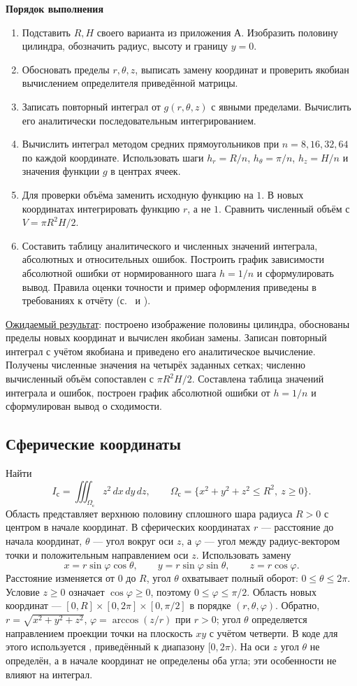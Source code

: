 \documentclass[12pt,a4paper]{article}
\newcommand{\taskhead}[1]{\par\textbf{#1}\par}
\begin{document}
\taskhead{Порядок выполнения}
\begin{enumerate}
\item Подставить $R,H$ своего варианта из приложения А.
Изобразить половину цилиндра, обозначить радиус, высоту и границу $y=0$.
\item Обосновать пределы $r,\theta,z$, выписать замену координат и проверить
якобиан вычислением определителя приведённой матрицы.
\item Записать повторный интеграл от $g(r,\theta,z)$ с явными пределами.
Вычислить его аналитически последовательным интегрированием.
\item Вычислить интеграл методом средних прямоугольников при $n=8,16,32,64$
по каждой координате. Использовать шаги $h_r=R/n$, $h_\theta=\pi/n$,
$h_z=H/n$ и значения функции $g$ в центрах ячеек.
\item Для проверки объёма заменить исходную функцию на $1$.
В новых координатах интегрировать функцию $r$, а не $1$.
Сравнить численный объём с $V=\pi R^2H/2$.
\item Составить таблицу аналитического и численных значений интеграла,
абсолютных и относительных ошибок. Построить график зависимости абсолютной
ошибки от нормированного шага $h=1/n$ и сформулировать вывод.
Правила оценки точности и пример оформления приведены в требованиях
к отчёту (с.~\pageref{sec:accuracy} и \pageref{sec:error-example}).
\end{enumerate}
\underline{Ожидаемый результат}: построено изображение половины цилиндра,
обоснованы пределы новых координат и вычислен якобиан замены.
Записан повторный интеграл с учётом якобиана и приведено его аналитическое
вычисление. Получены численные значения на четырёх заданных сетках;
численно вычисленный объём сопоставлен с $\pi R^2H/2$.
Составлена таблица значений интеграла и ошибок, построен график абсолютной
ошибки от $h=1/n$ и сформулирован вывод о сходимости.

\subsection{Сферические координаты}
Найти
\[
I_{\mathrm{с}}=\iiint_{\Omega_{\mathrm{с}}}z^2\,dx\,dy\,dz,\qquad
\Omega_{\mathrm{с}}=\{x^2+y^2+z^2\leq R^2,\ z\geq0\}.
\]
Область представляет верхнюю половину сплошного шара радиуса $R>0$
с центром в начале координат. В сферических координатах $r$ --- расстояние
до начала координат, $\theta$ --- угол вокруг оси $z$, а $\varphi$ ---
угол между радиус-вектором точки и положительным направлением оси $z$.
Использовать замену
\[
x=r\sin\varphi\cos\theta,\qquad y=r\sin\varphi\sin\theta,\qquad
z=r\cos\varphi.
\]
Расстояние изменяется от $0$ до $R$, угол $\theta$ охватывает полный оборот:
$0\leq\theta\leq2\pi$. Условие $z\geq0$ означает $\cos\varphi\geq0$,
поэтому $0\leq\varphi\leq\pi/2$.
Область новых координат --- $[0,R]\times[0,2\pi]\times[0,\pi/2]$
в порядке $(r,\theta,\varphi)$.
Обратно, $r=\sqrt{x^2+y^2+z^2}$, $\varphi=\arccos(z/r)$ при $r>0$;
угол $\theta$ определяется направлением проекции точки на плоскость $xy$
с учётом четверти. В коде для этого используется ,
приведённый к диапазону $[0,2\pi)$. На оси $z$ угол $\theta$ не определён,
а в начале координат не определены оба угла; эти особенности не влияют на интеграл.
\end{document}
